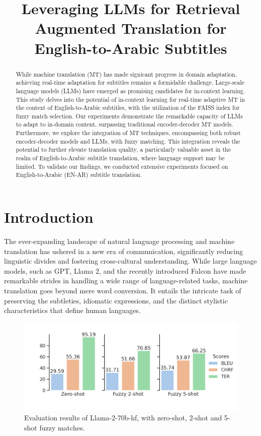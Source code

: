 \documentclass[twocolumn]{article}
\title{Leveraging LLMs for Retrieval Augmented Translation for English-to-Arabic Subtitles}
\date{}  %
\begin{document}
\maketitle

\begin{abstract}
While machine translation (MT) has made signicant progress in domain adaptation, achieving real-time adaptation for subtitles remains a formidable challenge. Large-scale language models (LLMs) have emerged as promising candidates for in-context learning. This study delves into the potential of in-context learning for real-time adaptive MT in the context of English-to-Arabic subtitles, with the utilization of the FAISS index for fuzzy match selection. Our experiments demonstrate the remarkable capacity of LLMs to adapt to in-domain content, surpassing traditional encoder-decoder MT models. Furthermore, we explore the integration of MT techniques, encompassing both robust encoder-decoder models and LLMs, with fuzzy matching. This integration reveals the potential to further elevate translation quality, a particularly valuable asset in the realm of English-to-Arabic subtitle translation, where language support may be limited. To validate our findings, we conducted extensive experiments focused on English-to-Arabic (EN-AR) subtitle translation.

\end{abstract}
%
\section{Introduction}\label{sec:introduction}

The ever-expanding landscape of natural language processing and machine translation has ushered in a new era of communication, significantly reducing linguistic divides and fostering cross-cultural understanding. While large language models, such as GPT, Llama 2, and the recently introduced Falcon have made remarkable strides in handling a wide range of language-related tasks, machine translation goes beyond mere word conversion. It entails the intricate task of preserving the subtleties, idiomatic expressions, and the distinct stylistic characteristics that define human languages.

\begin{figure}
\centering
\includegraphics[width=\linewidth, ]{figs/Llama2_evaluation} %
\caption{ Evaluation results of Llama-2-70b-hf, with zero-shot, 2-shot and 5-shot fuzzy matches.}

\label{llama_2_evaluation:duck}
\end{figure}
\end{document}
